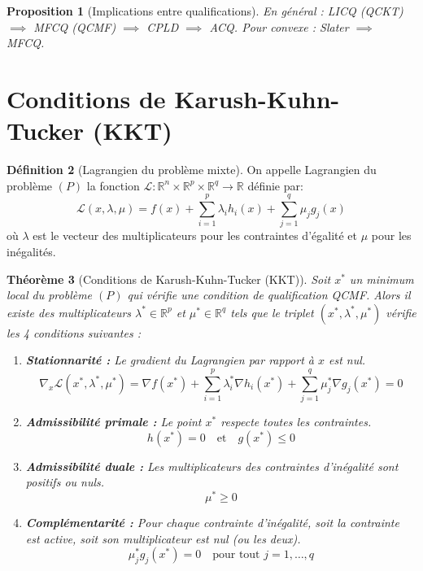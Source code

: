 \documentclass[a4paper,12pt,openany]{book}
\theoremstyle{plain}
\newtheorem{theorem}{Théorème}[section]
\newtheorem{proposition}[theorem]{Proposition}
\theoremstyle{definition}
\newtheorem{definition}[theorem]{Définition}
\theoremstyle{remark}
\theoremstyle{nbstyle}
\newcommand{\R}{\mathbb{R}}
\newcommand{\grad}{\nabla}
\begin{document}
	\begin{proposition}[Implications entre qualifications]
		En général : LICQ (QCKT) \(\implies\) MFCQ (QCMF) \(\implies\) CPLD \(\implies\) ACQ. Pour convexe : Slater \(\implies\) MFCQ.
	\end{proposition}
	
	\section{Conditions de Karush-Kuhn-Tucker (KKT)}
	
	\begin{definition}[Lagrangien du problème mixte]
		On appelle Lagrangien du problème $(P)$ la fonction $\mathcal{L}: \R^n \times \R^p \times \R^q \to \R$ définie par:
		$$\mathcal{L}(x, \lambda, \mu) = f(x) + \sum_{i=1}^{p}\lambda_{i}h_{i}(x) + \sum_{j=1}^{q}\mu_{j}g_{j}(x)$$
		où $\lambda$ est le vecteur des multiplicateurs pour les contraintes d'égalité et $\mu$ pour les inégalités.
	\end{definition}
	
	\begin{theorem}[Conditions de Karush-Kuhn-Tucker (KKT)]\label{Theo4.3.2}
		Soit $x^*$ un minimum local du problème $(P)$ qui vérifie une condition de qualification QCMF. Alors il existe des multiplicateurs $\lambda^* \in \R^p$ et $\mu^* \in \R^q$ tels que le triplet $(x^*, \lambda^*, \mu^*)$ vérifie les 4 conditions suivantes :
		\begin{enumerate}
			\item \textbf{Stationnarité :} Le gradient du Lagrangien par rapport à $x$ est nul.
			$$\grad_x \mathcal{L}(x^*, \lambda^*, \mu^*) = \nabla f(x^*) + \sum_{i=1}^p \lambda_i^* \nabla h_i(x^*) + \sum_{j=1}^q \mu_j^* \nabla g_j(x^*) = 0$$
			\item \textbf{Admissibilité primale :} Le point $x^*$ respecte toutes les contraintes.
			$$h(x^*) = 0 \quad \text{et} \quad g(x^*) \le 0$$
			\item \textbf{Admissibilité duale :} Les multiplicateurs des contraintes d'inégalité sont positifs ou nuls.
			$$\mu^* \ge 0$$
			\item \textbf{Complémentarité :} Pour chaque contrainte d'inégalité, soit la contrainte est active, soit son multiplicateur est nul (ou les deux).
			$$\mu_j^* g_j(x^*) = 0 \quad \text{pour tout } j=1,\dots,q$$
		\end{enumerate}
	\end{theorem}
	
\end{document}
